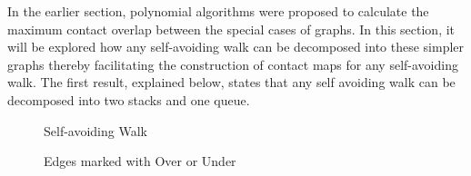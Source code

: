 In the earlier section, polynomial algorithms were proposed to calculate the maximum contact overlap between the special cases of graphs. In this section, it will be explored how any self-avoiding walk can be decomposed into these simpler graphs thereby facilitating the construction of contact maps for any self-avoiding walk. The first result, explained below, states that any self avoiding walk can be decomposed into two stacks and one queue.


\begin{figure}[htbp]
\begin{minipage}[b]{0.45\linewidth}
 \centering
 
 \caption{Self-avoiding Walk}
 \label{fig:saw2}
\end{minipage}
\hspace{0.1\linewidth}
\begin{minipage}[b]{0.45\linewidth}
\centering
 
 \caption{Edges marked with Over or Under}
 \label{fig:EOU}
\end{minipage}
\end{figure}


